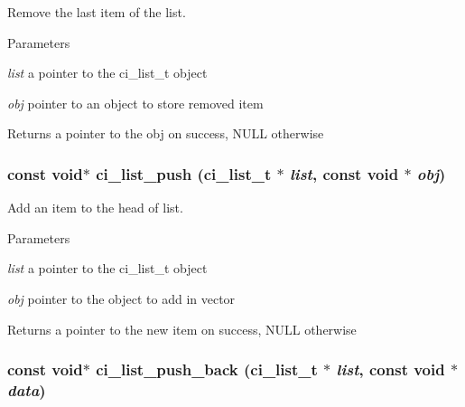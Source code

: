 Remove the last item of the list. 
\begin{DoxyParams}{Parameters}
\item[{\em list}]a pointer to the ci\_\-list\_\-t object \item[{\em obj}]pointer to an object to store removed item \end{DoxyParams}
\begin{DoxyReturn}{Returns}
a pointer to the obj on success, NULL otherwise 
\end{DoxyReturn}
\hypertarget{group__LISTS_ga3831f98e89e66269a1285a3db4e7f828}{
\subsubsection[{ci\_\-list\_\-push}]{\setlength{\rightskip}{0pt plus 5cm}const void$\ast$ ci\_\-list\_\-push ({\bf ci\_\-list\_\-t} $\ast$ {\em list}, \/  const void $\ast$ {\em obj})}}
\label{group__LISTS_ga3831f98e89e66269a1285a3db4e7f828}


Add an item to the head of list. 
\begin{DoxyParams}{Parameters}
\item[{\em list}]a pointer to the ci\_\-list\_\-t object \item[{\em obj}]pointer to the object to add in vector \end{DoxyParams}
\begin{DoxyReturn}{Returns}
a pointer to the new item on success, NULL otherwise 
\end{DoxyReturn}
\hypertarget{group__LISTS_gaa0dae6fec0c83e67b1630bb7c6cea78c}{
\subsubsection[{ci\_\-list\_\-push\_\-back}]{\setlength{\rightskip}{0pt plus 5cm}const void$\ast$ ci\_\-list\_\-push\_\-back ({\bf ci\_\-list\_\-t} $\ast$ {\em list}, \/  const void $\ast$ {\em data})}}
\label{group__LISTS_gaa0dae6fec0c83e67b1630bb7c6cea78c}


